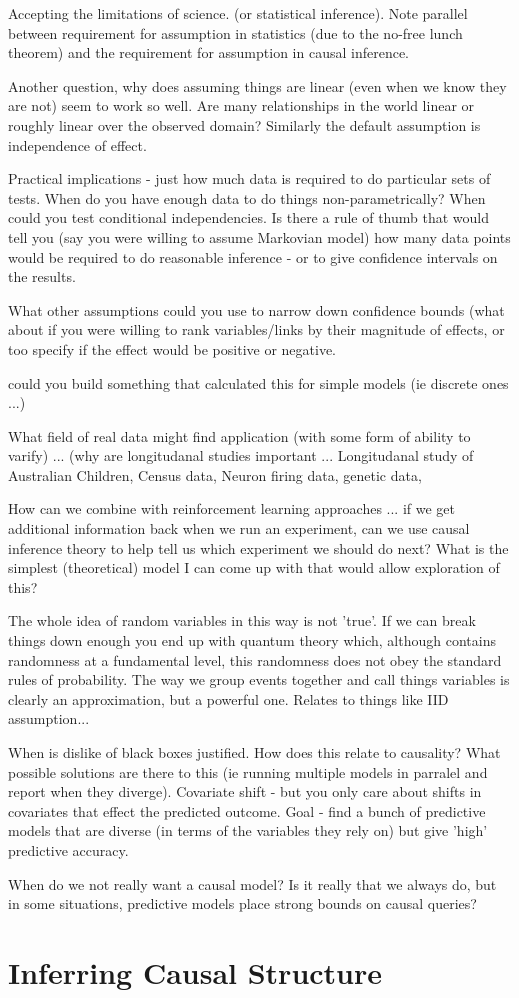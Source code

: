 \documentclass[11pt,a4paper]{article}
\begin{document}
Accepting the limitations of science. (or statistical inference). Note parallel between requirement for assumption in statistics (due to the no-free lunch theorem) and the requirement for assumption in causal inference.

Another question, why does assuming things are linear (even when we know they are not) seem to work so well. Are many relationships in the world linear or roughly linear over the observed domain? Similarly the default assumption is independence of effect. 

Practical implications - just how much data is required to do particular sets of tests. When do you have enough data to do things non-parametrically? When could you test conditional independencies. Is there a rule of thumb that would tell you (say you were willing to assume Markovian model) how many data points would be required to do reasonable inference - or to give confidence intervals on the results. 

What other assumptions could you use to narrow down confidence bounds (what about if you were willing to rank variables/links by their magnitude of effects, or too specify if the effect would be positive or negative. 

could you build something that calculated this for simple models (ie discrete ones ...)

What field of real data might find application (with some form of ability to varify) ... (why are longitudanal studies important ... Longitudanal study of Australian Children, Census data, Neuron firing data, genetic data, 

How can we combine with reinforcement learning approaches ... if we get additional information back when we run an experiment, can we use causal inference theory to help tell us which experiment we should do next? What is the simplest (theoretical) model I can come up with that would allow exploration of this?

The whole idea of random variables in this way is not 'true'. If we can break things down enough you end up with quantum theory which, although contains randomness at a fundamental level, this randomness does not obey the standard rules of probability. The way we group events together and call things variables is clearly an approximation, but a powerful one. Relates to things like IID assumption...


When is dislike of black boxes justified. How does this relate to causality? What possible solutions are there to this (ie running multiple models in parralel and report when they diverge). Covariate shift - but you only care about shifts in covariates that effect the predicted outcome. Goal - find a bunch of predictive models that are diverse (in terms of the variables they rely on) but give 'high' predictive accuracy. 

When do we not really want a causal model? Is it really that we always do, but in some situations, predictive models place strong bounds on causal queries?




\section*{Inferring Causal Structure}
\end{document}
